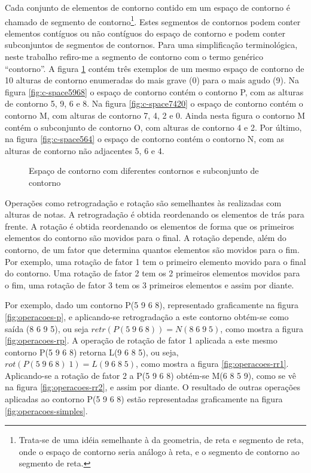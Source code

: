 Cada conjunto de elementos de contorno contido em um espaço de
contorno é chamado de segmento de contorno\footnote{Trata-se de uma
  idéia semelhante à da geometria, de reta e segmento de reta, onde o
  espaço de contorno seria análogo à reta, e o segmento de contorno ao
  segmento de reta.}. Estes segmentos de contornos podem conter
elementos contíguos ou não contíguos do espaço de contorno e podem
conter subconjuntos de segmentos de contornos. Para uma simplificação
terminológica, neste trabalho refiro-me a segmento de contorno com o
termo genérico ``contorno''. A figura \ref{fig:c-space} contém três
exemplos de um mesmo espaço de contorno de 10 alturas de contorno
enumeradas do mais grave (0) para o mais agudo (9). Na figura
\ref{fig:c-space5968} o espaço de contorno contém o contorno P, com as
alturas de contorno 5, 9, 6 e 8. Na figura \ref{fig:c-space7420} o
espaço de contorno contém o contorno M, com alturas de contorno 7, 4,
2 e 0. Ainda nesta figura o contorno M contém o subconjunto de
contorno O, com alturas de contorno 4 e 2. Por último, na figura
\ref{fig:c-space564} o espaço de contorno contém o contorno N, com as
alturas de contorno não adjacentes 5, 6 e 4.

\begin{figure}
  \centering

  \caption{Espaço de contorno com diferentes contornos e subconjunto
    de contorno}
  \label{fig:c-space}
\end{figure}

Operações como retrogradação e rotação são semelhantes às realizadas
com alturas de notas. A retrogradação é obtida reordenando os
elementos de trás para frente. A rotação é obtida reordenando os
elementos de forma que os primeiros elementos do contorno são movidos
para o final. A rotação depende, além do contorno, de um fator que
determina quantos elementos são movidos para o fim. Por exemplo, uma
rotação de fator 1 tem o primeiro elemento movido para o final do
contorno. Uma rotação de fator 2 tem os 2 primeiros elementos movidos
para o fim, uma rotação de fator 3 tem os 3 primeiros elementos e
assim por diante.

Por exemplo, dado um contorno P(5 9 6 8), representado graficamente na
figura \ref{fig:operacoes-p}, e aplicando-se retrogradação a este
contorno obtém-se como saída (8 6 9 5), ou seja
$retr(P(5\;9\;6\;8))=N(8\;6\;9\;5)$, como mostra a figura
\ref{fig:operacoes-rp}. A operação de rotação de fator 1 aplicada a
este mesmo contorno P(5 9 6 8) retorna L(9 6 8 5), ou seja,
$rot(P(5\;9\;6\;8)\;1)=L(9\;6\;8\;5)$, como mostra a figura
\ref{fig:operacoes-rr1}. Aplicando-se a rotação de fator 2 a P(5 9 6
8) obtém-se M(6 8 5 9), como se vê na figura \ref{fig:operacoes-rr2},
e assim por diante. O resultado de outras operações aplicadas ao
contorno P(5 9 6 8) estão representadas graficamente na figura
\ref{fig:operacoes-simples}.

